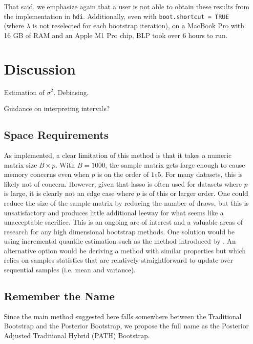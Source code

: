 That said, we emphasize again that a user is not able to obtain these results from the implementation in \texttt{hdi}. Additionally, even with \texttt{boot.shortcut = TRUE} (where $\lambda$ is not reselected for each bootstrap iteration), on a MacBook Pro with 16 GB of RAM and an Apple M1 Pro chip, BLP took over 6 hours to run. 

\section{Discussion}

Estimation of $\sigma^2$. Debiasing.

Guidance on interpreting intervals?

\subsection{Space Requirements}

As implemented, a clear limitation of this method is that it takes a numeric matrix size $B \times p$. With $B = 1000$, the sample matrix gets large enough to cause memory concerns even when $p$ is on the order of $1e5$. For many datasets, this is likely not of concern. However, given that lasso is often used for datasets where $p$ is large, it is clearly not an edge case where $p$ is of this or larger order. One could reduce the size of the sample matrix by reducing the number of draws, but this is unsatisfactory and produces little additional leeway for what seems like a unacceptable sacrifice. This is an ongoing are of interest and a valuable areas of research for any high dimensional bootstrap methods. One solution would be using incremental quantile estimation such as the method introduced by \cite{Tierney1983}. An alternative option would be deriving a method with similar properties but which relies on samples statistics that are relatively straightforward to update over sequential samples (i.e. mean and variance).

\subsection{Remember the Name}

Since the main method suggested here falls somewhere between the Traditional Bootstrap and the Posterior Bootstrap, we propose the full name as the Posterior Adjusted Traditional Hybrid (PATH) Bootstrap.

